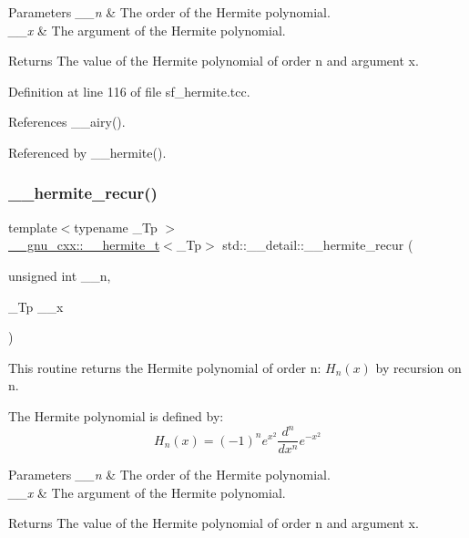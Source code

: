 \begin{DoxyParams}{Parameters}
{\em \+\_\+\+\_\+n} & The order of the Hermite polynomial. \\
\hline
{\em \+\_\+\+\_\+x} & The argument of the Hermite polynomial. \\
\hline
\end{DoxyParams}
\begin{DoxyReturn}{Returns}
The value of the Hermite polynomial of order n and argument x. 
\end{DoxyReturn}


Definition at line 116 of file sf\+\_\+hermite.\+tcc.



References \+\_\+\+\_\+airy().



Referenced by \+\_\+\+\_\+hermite().

\mbox{\label{namespacestd_1_1____detail_addad9d3f5ca8a7ddae63c9e7c5374e70}} 
\subsubsection{\texorpdfstring{\+\_\+\+\_\+hermite\+\_\+recur()}{\_\_hermite\_recur()}}
{\footnotesize\ttfamily template$<$typename \+\_\+\+Tp $>$ \\
\hyperlink{struct____gnu__cxx_1_1____hermite__t}{\+\_\+\+\_\+gnu\+\_\+cxx\+::\+\_\+\+\_\+hermite\+\_\+t}$<$\+\_\+\+Tp$>$ std\+::\+\_\+\+\_\+detail\+::\+\_\+\+\_\+hermite\+\_\+recur (\begin{DoxyParamCaption}\item[{unsigned int}]{\+\_\+\+\_\+n,  }\item[{\+\_\+\+Tp}]{\+\_\+\+\_\+x }\end{DoxyParamCaption})}



This routine returns the Hermite polynomial of order n\+: $ H_n(x) $ by recursion on n. 

The Hermite polynomial is defined by\+: \[ H_n(x) = (-1)^n e^{x^2} \frac{d^n}{dx^n} e^{-x^2} \]


\begin{DoxyParams}{Parameters}
{\em \+\_\+\+\_\+n} & The order of the Hermite polynomial. \\
\hline
{\em \+\_\+\+\_\+x} & The argument of the Hermite polynomial. \\
\hline
\end{DoxyParams}
\begin{DoxyReturn}{Returns}
The value of the Hermite polynomial of order n and argument x. 
\end{DoxyReturn}



